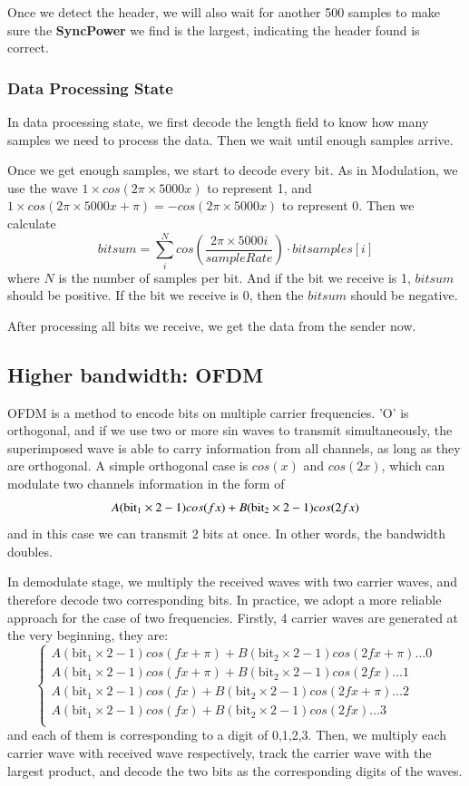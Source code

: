 \documentclass[11pt, conference]{IEEEtran}
\begin{document}
    Once we detect the header, we will also wait for another 500 samples to make sure the \textbf{SyncPower} we find is the largest, indicating the header found is correct.
\subsubsection{Data Processing State}
    In data processing state, we first decode the length field to know how many samples we need to process the data.
    Then we wait until enough samples arrive.

    Once we get enough samples, we start to decode every bit. As in Modulation, we use the wave $1 \times cos(2\pi \times 5000 x)$ to represent 1, and
    $  1 \times cos(2\pi \times 5000 x + \pi) = -cos(2\pi \times 5000 x)$ to represent 0. Then we calculate 
    $$bitsum = \sum_{i}^{N}cos(\frac{2\pi \times 5000 i}{sampleRate}) \cdot bitsamples[i] $$
    where $N$ is the number of samples per bit. And if the bit we receive is 1, $bitsum$ should be positive. If the bit we receive is 0, then the $bitsum$
    should be negative.

    After processing all bits we receive, we get the data from the sender now.
\subsection{Higher bandwidth: OFDM}

OFDM is a method to encode bits on multiple carrier frequencies. 'O' is orthogonal, and if we use two or more sin waves to transmit simultaneously,
the superimposed wave is able to carry information from all channels, as long as they are orthogonal. A simple orthogonal case is $cos(x)$ and $cos(2x)$,
which can modulate two channels information in the form of 
\[
    A(\text{bit}_1 \times 2 - 1)cos(fx) + B(\text{bit}_2 \times 2 - 1)cos(2fx)\\
\]
and in this case we can transmit 2 bits at once. In other words, the bandwidth doubles. 

In demodulate stage, we multiply the received waves with two carrier waves, and therefore decode two corresponding bits.
In practice, we adopt a more reliable approach for the case of two frequencies. Firstly, 4 carrier waves are generated at the
very beginning, they are:
\[
    \begin{cases}
    A(\text{bit}_1 \times 2 - 1)cos(fx+\pi) + B(\text{bit}_2 \times 2 - 1)cos(2fx + \pi) \dots 0 \\
    A(\text{bit}_1 \times 2 - 1)cos(fx+\pi) + B(\text{bit}_2 \times 2 - 1)cos(2fx) \dots 1\\
    A(\text{bit}_1 \times 2 - 1)cos(fx) + B(\text{bit}_2 \times 2 - 1)cos(2fx + \pi) \dots 2\\
    A(\text{bit}_1 \times 2 - 1)cos(fx) + B(\text{bit}_2 \times 2 - 1)cos(2fx) \dots 3\\
    \end{cases}
\]
and each of them is corresponding to a digit of 0,1,2,3. Then, we multiply each carrier wave with received wave respectively, track the carrier wave with the largest product, and decode the two
bits as the corresponding digits of the waves.
\end{document}
